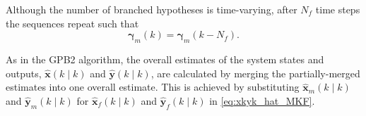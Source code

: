 {{%
Although the number of branched hypotheses is time-varying, after $N_f$ time steps the sequences repeat such that
%
\begin{equation} \label{eq:rmkrmkmNf_SFex2}
	\mathbf{\gamma}_m(k) = \mathbf{\gamma}_m(k-N_f).
\end{equation}

As in the \gls{GPB2} algorithm, the overall estimates of the system states and outputs, $\hat{\mathbf{x}}(k \mid k)$ and $\hat{\mathbf{y}}(k \mid k)$, are calculated by merging the partially-merged estimates into one overall estimate. This is achieved by substituting $\mathbf{\hat{x}}_m(k \mid k)$ and $\mathbf{\hat{y}}_m(k \mid k)$ for $\mathbf{\hat{x}}_f(k \mid k)$ and $\mathbf{\hat{y}}_f(k \mid k)$ in \eqref{eq:xkyk_hat_MKF}.

}}
